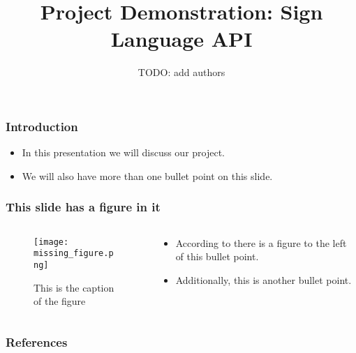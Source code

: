 \documentclass{beamer}
\title{Project Demonstration: Sign Language API}
\author{TODO: add authors}
\date{}
\begin{document}
\begin{frame}[t]
	\titlepage
\end{frame}

\begin{frame}[t]
	\frametitle{Introduction}
	\begin{itemize}
		\item In this presentation we will discuss our project.
		\item We will also have more than one bullet point on this slide.
	\end{itemize}
\end{frame}

\begin{frame}[t]
	\frametitle{This slide has a figure in it}
	\begin{columns}
	\begin{column}{0.5\textwidth}
		\begin{figure}
			\texttt{[image: missing\_figure.png]}
			\caption{This is the caption of the figure}
			\label{fig:missing_figure}
		\end{figure}
		\end{column}
		\begin{column}{0.5\textwidth}
			\begin{itemize}
				\item According to \cite{me} there is a figure to the left of this bullet point.
				\item Additionally, this is another bullet point.
			\end{itemize}
		\end{column}
	\end{columns}
\end{frame}

\begin{frame}[t]
	\frametitle{References}
	
	
\end{frame}
\end{document}
